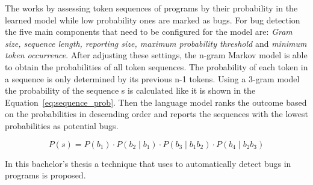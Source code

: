 The \ngram{} works by assessing token sequences of programs by their probability in the learned model while low probability ones are marked as bugs. For bug detection the five main components that need to be configured for the model are: \textit{Gram size, sequence length, reporting size, maximum probability threshold} and \textit{minimum token occurrence}. After adjusting these settings, the n-gram Markov model is able to obtain the probabilities of all token sequences. The probability of each token in a sequence is only determined by its previous n-1 tokens. Using a 3-gram model the probability of the sequence s is calculated like it is shown in the Equation~\ref{eq:sequence_prob}. Then the language model ranks the outcome based on the probabilities in descending order and reports the sequences with the lowest probabilities as potential bugs. 
 
\begin{equation} \label{eq:sequence_prob}
P(s) ={} P(b_{1})\cdot P(b_{2}\mid b_{1})\cdot P(b_{3}\mid b_{1}b_{2})\cdot P(b_{4}\mid b_{2}b_{3})
\end{equation}

In this bachelor's thesis a technique that uses  to automatically detect bugs in \scratch{} programs is proposed. 

